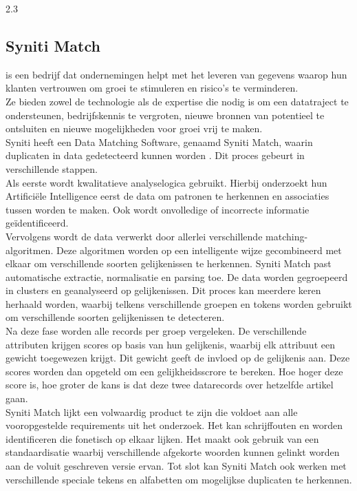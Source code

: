 2.3	\subsection{Syniti Match}
\textcite{SynitiAbout} is een bedrijf dat ondernemingen helpt met het leveren van gegevens waarop hun klanten  vertrouwen om groei te stimuleren en risico's te verminderen.
\\Ze bieden zowel de technologie als de expertise die nodig is om een datatraject te ondersteunen, bedrijfskennis te vergroten, nieuwe bronnen van potentieel te ontsluiten en nieuwe mogelijkheden voor groei vrij te maken.
\\Syniti heeft een Data Matching Software, genaamd Syniti Match, waarin duplicaten in data gedetecteerd kunnen worden \autocite{SynitiMatch}. Dit proces gebeurt in verschillende stappen. 
\\Als eerste wordt kwalitatieve analyselogica gebruikt. Hierbij onderzoekt hun Artificiële Intelligence eerst de data om patronen te herkennen en associaties tussen worden te maken. Ook wordt onvolledige of incorrecte informatie geïdentificeerd. 
\\Vervolgens wordt de data verwerkt door allerlei verschillende matching-algoritmen. Deze algoritmen worden op een intelligente wijze gecombineerd met elkaar om verschillende soorten gelijkenissen te herkennen. Syniti Match past automatische extractie, normalisatie en parsing toe. De data worden gegroepeerd in clusters en geanalyseerd op gelijkenissen. Dit proces kan meerdere keren herhaald worden, waarbij telkens verschillende groepen en tokens worden gebruikt om verschillende soorten gelijkenissen te detecteren. 
\\Na deze fase worden alle records per groep vergeleken. De verschillende attributen krijgen scores op basis van hun gelijkenis, waarbij elk attribuut een gewicht toegewezen krijgt. Dit gewicht geeft de invloed op de gelijkenis aan. Deze scores worden dan opgeteld om een gelijkheidsscrore te bereken. Hoe hoger deze score is, hoe groter de kans is dat deze twee datarecords over hetzelfde artikel gaan. 
\\Syniti Match lijkt een volwaardig product te zijn die voldoet aan alle vooropgestelde requirements uit het onderzoek. Het kan schrijffouten en worden identificeren die fonetisch op elkaar lijken. Het maakt ook gebruik van een standaardisatie waarbij verschillende afgekorte woorden kunnen gelinkt worden aan de voluit geschreven versie ervan. Tot slot kan Syniti Match ook werken met verschillende speciale tekens en alfabetten om mogelijkse duplicaten te herkennen.

